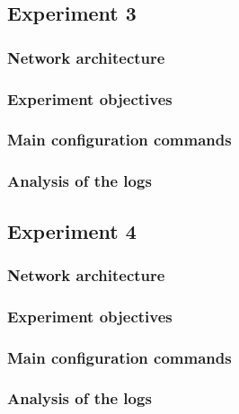 \documentclass[a4paper,11pt,english]{article}
\begin{document}
    \subsection{Experiment 3}
        \subsubsection{Network architecture}

        \subsubsection{Experiment objectives}

        \subsubsection{Main configuration commands}

        \subsubsection{Analysis of the logs}


    \subsection{Experiment 4}
        \subsubsection{Network architecture}

        \subsubsection{Experiment objectives}

        \subsubsection{Main configuration commands}

        \subsubsection{Analysis of the logs}
\end{document}
